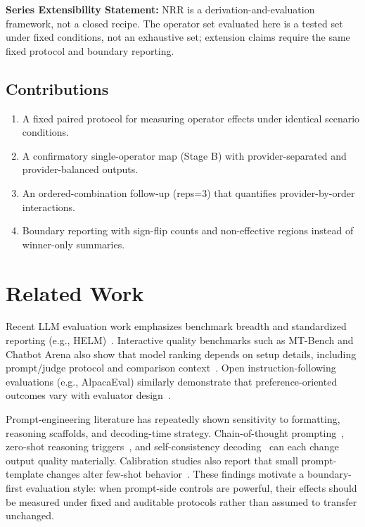 \documentclass[11pt,a4paper]{article}
\begin{document}
\textbf{Series Extensibility Statement:}
NRR is a derivation-and-evaluation framework, not a closed recipe. The operator set evaluated here is a tested set under fixed conditions, not an exhaustive set; extension claims require the same fixed protocol and boundary reporting.

\subsection{Contributions}

\begin{enumerate}
  \item A fixed paired protocol for measuring operator effects under identical scenario conditions.
  \item A confirmatory single-operator map (Stage B) with provider-separated and provider-balanced outputs.
  \item An ordered-combination follow-up (reps=3) that quantifies provider-by-order interactions.
  \item Boundary reporting with sign-flip counts and non-effective regions instead of winner-only summaries.
\end{enumerate}

\section{Related Work}
\label{sec:related}

Recent LLM evaluation work emphasizes benchmark breadth and standardized reporting (e.g., HELM)~\cite{liang2022helm}. Interactive quality benchmarks such as MT-Bench and Chatbot Arena also show that model ranking depends on setup details, including prompt/judge protocol and comparison context~\cite{zheng2023mtbench}. Open instruction-following evaluations (e.g., AlpacaEval) similarly demonstrate that preference-oriented outcomes vary with evaluator design~\cite{dubois2024alpacaeval}.

Prompt-engineering literature has repeatedly shown sensitivity to formatting, reasoning scaffolds, and decoding-time strategy. Chain-of-thought prompting~\cite{wei2022cot}, zero-shot reasoning triggers~\cite{kojima2022zeroshot}, and self-consistency decoding~\cite{wang2023selfconsistency} can each change output quality materially. Calibration studies also report that small prompt-template changes alter few-shot behavior~\cite{zhao2021calibrate}. These findings motivate a boundary-first evaluation style: when prompt-side controls are powerful, their effects should be measured under fixed and auditable protocols rather than assumed to transfer unchanged.
\end{document}
